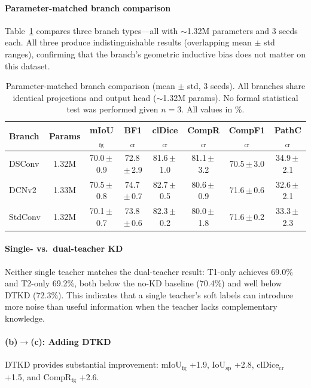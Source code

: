 \documentclass[review,authoryear]{elsarticle}
\begin{document}
\paragraph{Parameter-matched branch comparison}
Table~\ref{tab:branch_compare} compares three branch types---all with ${\sim}$1.32M parameters and 3 seeds each. All three produce indistinguishable results (overlapping mean $\pm$ std ranges), confirming that the branch's geometric inductive bias does not matter on this dataset.

\begin{table}[t]
\centering
\caption{Parameter-matched branch comparison (mean $\pm$ std, 3 seeds). All branches share identical projections and output head (${\sim}$1.32M params). No formal statistical test was performed given $n{=}3$. All values in \%.}
\label{tab:branch_compare}
\setlength{\tabcolsep}{3.5pt}
\begin{tabular}{lccccccc}
\toprule
Branch & Params & mIoU$_{\text{fg}}$ & BF1$_{\text{cr}}$ & clDice$_{\text{cr}}$ & CompR$_{\text{cr}}$ & CompF1$_{\text{cr}}$ & PathC$_{\text{cr}}$ \\
\midrule
DSConv & 1.32M & 70.0\,$\pm$\,0.9 & 72.8\,$\pm$\,2.9 & 81.6\,$\pm$\,1.0 & 81.1\,$\pm$\,3.2 & 70.5\,$\pm$\,3.0 & 34.9\,$\pm$\,2.1 \\
DCNv2 & 1.33M & 70.5\,$\pm$\,0.8 & 74.7\,$\pm$\,0.7 & 82.7\,$\pm$\,0.5 & 80.6\,$\pm$\,0.9 & 71.6\,$\pm$\,0.6 & 32.6\,$\pm$\,2.1 \\
StdConv & 1.32M & 70.1\,$\pm$\,0.7 & 73.8\,$\pm$\,0.6 & 82.3\,$\pm$\,0.2 & 80.0\,$\pm$\,1.8 & 71.6\,$\pm$\,0.2 & 33.3\,$\pm$\,2.3 \\
\bottomrule
\end{tabular}
\end{table}

\paragraph{Single- vs.\ dual-teacher KD}
Neither single teacher matches the dual-teacher result: T1-only achieves 69.0\% and T2-only 69.2\%, both below the no-KD baseline (70.4\%) and well below DTKD (72.3\%).
This indicates that a single teacher's soft labels can introduce more noise than useful information when the teacher lacks complementary knowledge.

\paragraph{(b)$\to$(c): Adding DTKD}
DTKD provides substantial improvement: mIoU$_{\text{fg}}$ +1.9, IoU$_{\text{sp}}$ +2.8, clDice$_{\text{cr}}$ +1.5, and CompR$_{\text{fg}}$ +2.6.
\end{document}
